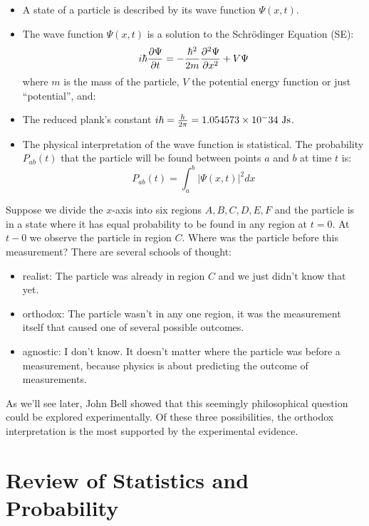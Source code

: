 \documentclass[12pt]{book}
\begin{document}
\begin{itemize}

\item A state of a particle is described by its wave function $\Psi(x,t)$.

\item The wave function $\Psi(x,t)$ is a solution to the Schr\"odinger Equation (SE):
\begin{equation}
\label{eqn:se}
i \hbar  \frac{\partial \Psi}{\partial t}  = - \frac{\hbar^2}{2 m} \frac{\partial^2 \Psi}{\partial x^2}  + V \Psi
\end{equation}
where $m$ is the mass of the particle, $V$ the potential energy function or just ``potential'', and:  

\item The reduced plank's constant $i \hbar = \frac{h}{2 \pi} = 1.054573 \times 10^-34~\rm Js$.

\item The physical interpretation of the wave function is statistical.  The probability $P_{ab}(t)$ that the particle will be found between points $a$ and $b$ at time $t$ is:
\begin{equation}
\label{eqn:prob}
P_{ab}(t) = \int_a^b |\Psi(x,t)|^2 dx
\end{equation}
\end{itemize}

Suppose we divide the $x$-axis into six regions $A,B,C,D,E,F$ and the particle is in a state where it has equal probability to be found in any region at $t=0$.  At $t-0$ we observe the particle in region $C$.  Where was the particle before this measurement?  There are several schools of thought:
\begin{itemize}
\item realist:  The particle was already in region $C$ and we just didn't know that yet.
\item orthodox:  The particle wasn't in any one region, it was the measurement itself that caused one of several possible outcomes.
\item agnostic:  I don't know.  It doesn't matter where the particle was before a measurement, because physics is about predicting the outcome of measurements.
\end{itemize}
As we'll see later, John Bell showed that this seemingly philosophical question could be explored experimentally.  Of these three possibilities, the orthodox interpretation is the most supported by the experimental evidence.

\section{Review of Statistics and Probability}
\end{document}
